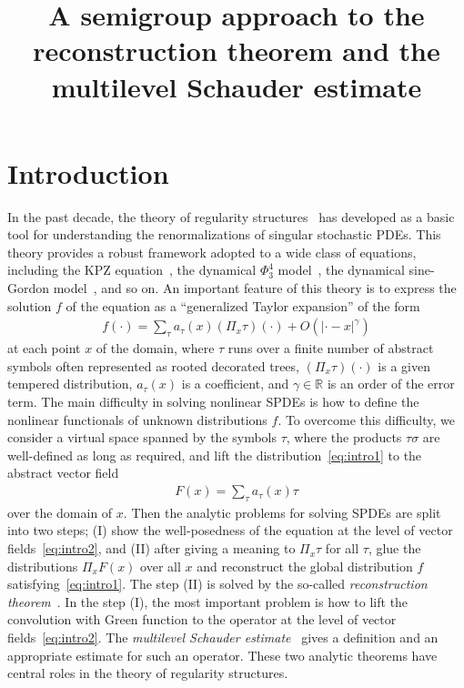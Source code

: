 \documentclass[AHL,Unicode,longabstracts,published]{cedram}
\title[A semigroup approach to the reconstruction theorem and the multilevel Schauder estimate]{A semigroup approach to the reconstruction theorem and the multilevel Schauder estimate}
\author[\initial{M.} \lastname{Hoshino}]{\firstname{Masato} \lastname{Hoshino}}
\newcommand{\bbR}{\mathbb{R}}
\begin{document}
\maketitle

\section{Introduction}



In the past decade, the theory of regularity structures~\cite{Hai14} has developed as a basic tool for understanding the renormalizations of singular stochastic PDEs. This theory provides a robust framework adopted to a wide class of equations, including the KPZ equation~\cite{Hai13, HQ18}, the dynamical $\Phi^4_3$ model~\cite{CMW23,HX18}, the dynamical sine-Gordon model~\cite{CHS18,HS16}, and so on. An important feature of this theory is to express the solution $f$ of the equation as a ``generalized Taylor expansion'' of the form
\begin{align}\label{eq:intro1}
f(\cdot)=\sum_\tau a_\tau(x)(\Pi_x\tau)(\cdot)+O(|\cdot-x|^\gamma)
\end{align}
at each point $x$ of the domain, where $\tau$ runs over a finite number of abstract symbols often represented as rooted decorated trees, $(\Pi_x\tau)(\cdot)$ is a given tempered distribution, $a_\tau(x)$ is a coefficient, and $\gamma\in\bbR$ is an order of the error term. The main difficulty in solving nonlinear SPDEs is how to define the nonlinear functionals of unknown distributions $f$. To overcome this difficulty, we consider a virtual space spanned by the symbols $\tau$, where the products $\tau\sigma$ are well-defined as long as required, and lift the distribution~\eqref{eq:intro1} to the abstract vector field
\begin{align}\label{eq:intro2}
F(x)=\sum_\tau a_\tau(x)\tau
\end{align}
over the domain of $x$. Then the analytic problems for solving SPDEs are split into two steps; (I) show the well-posedness of the equation at the level of vector fields~\eqref{eq:intro2}, and (I\!I) after giving a meaning to $\Pi_x\tau$ for all $\tau$, glue the distributions $\Pi_xF(x)$ over all $x$ and reconstruct the global distribution $f$ satisfying~\eqref{eq:intro1}. The step (I\!I) is solved by the so-called \emph{reconstruction theorem}~\cite[Section~3]{Hai14}. In the step (I), the most important problem is how to lift the convolution with Green function to the operator at the level of vector fields~\eqref{eq:intro2}. The \emph{multilevel Schauder estimate}~\cite[Section~5]{Hai14} gives a definition and an appropriate estimate for such an operator. These two analytic theorems have central roles in the theory of regularity structures.
\end{document}
